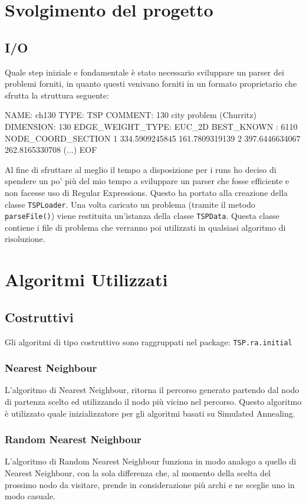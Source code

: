 \documentclass{article}
\newcommand{\ic}[1]{\texttt{#1}}
\begin{document}
\pagebreak
\section{Svolgimento del progetto}
\subsection{I/O}
Quale step iniziale e fondamentale è stato necessario sviluppare un parser dei problemi
forniti, in quanto questi venivano forniti in un formato proprietario che sfrutta la
struttura seguente:

\begin{tsp}
    NAME: ch130
    TYPE: TSP
    COMMENT: 130 city problem (Churritz)
    DIMENSION: 130
    EDGE_WEIGHT_TYPE: EUC_2D
    BEST_KNOWN : 6110
    NODE_COORD_SECTION
    1 334.5909245845 161.7809319139
    2 397.6446634067 262.8165330708
    (...)
    EOF
\end{tsp}

Al fine di sfruttare al meglio il tempo a disposizione per i runs ho deciso di spendere
un po' più del mio tempo a sviluppare un parser che fosse efficiente e non facesse
uso di Regular Expressions. Questo ha portato alla creazione della classe \ic{TSPLoader}.
Una volta caricato un problema (tramite il metodo \ic{parseFile()}) viene restituita
un'istanza della classe \ic{TSPData}. Questa classe contiene i file di problema che
verranno poi utilizzati in qualsiasi algoritmo di risoluzione.

\section{Algoritmi Utilizzati}

\subsection{Costruttivi}
Gli algoritmi di tipo costruttivo sono raggruppati nel package: \texttt{TSP.ra.initial}

\subsubsection{Nearest Neighbour}
L'algoritmo di Nearest Neighbour,
ritorna il percorso generato partendo dal nodo di partenza scelto ed utilizzando
il nodo più vicino nel percorso. Questo algoritmo è utilizzato quale inizializzatore
per gli algoritmi basati su Simulated Annealing.

\subsubsection{Random Nearest Neighbour}
L'algoritmo di Random Nearest Neighbour funziona in modo analogo a quello di Nearest
Neighbour, con la sola differenza che, al momento della scelta del prossimo nodo da
visitare, prende in considerazione più archi e ne sceglie uno in modo casuale.
\end{document}
